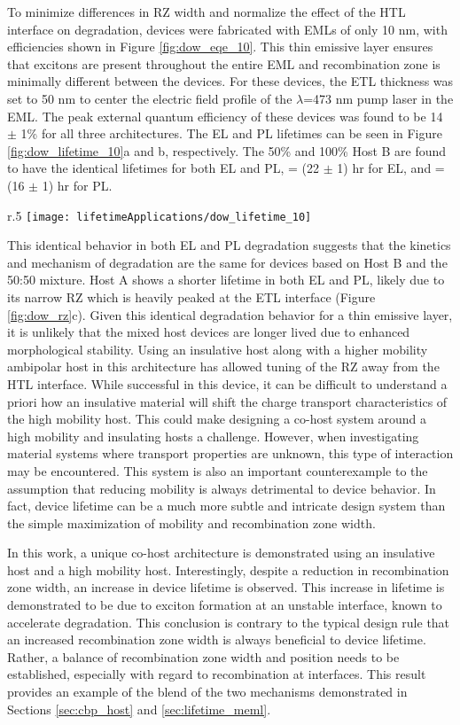 \documentclass[../thesis.tex]{subfiles}
\begin{document}
To minimize differences in RZ width and normalize the effect of the HTL interface on degradation, devices were fabricated with EMLs of only 10 nm, with efficiencies shown in Figure \ref{fig:dow_eqe_10}. 
This thin emissive layer ensures that excitons are present throughout the entire EML and recombination zone is minimally different between the devices. 
For these devices, the ETL thickness was set to 50 nm to center the electric field profile of the $\lambda$=473 nm pump laser in the EML. 
The peak external quantum efficiency of these devices was found to be 14 $\pm$ 1\% for all three architectures. 
The EL and PL lifetimes can be seen in Figure \ref{fig:dow_lifetime_10}a and b, respectively. The 50\% and 100\% Host B are found to have the identical lifetimes for both EL and PL,  = (22 $\pm$ 1) hr for EL, and  = (16 $\pm$ 1) hr for PL. 
\begin{wrapfigure}{r}{.5\textwidth}
\centering
\texttt{[image: lifetimeApplications/dow\_lifetime\_10]}
\caption{Lifetimes for the 10 nm EML devices.}
\label{fig:dow_lifetime_10}
\end{wrapfigure}
This identical behavior in both EL and PL degradation suggests that the kinetics and mechanism of degradation are the same for devices based on Host B and the 50:50 mixture. 
Host A shows a shorter lifetime in both EL and PL, likely due to its narrow RZ which is heavily peaked at the ETL interface (Figure \ref{fig:dow_rz}c). 
Given this identical degradation behavior for a thin emissive layer, it is unlikely that the mixed host devices are longer lived due to enhanced morphological stability. 
Using an insulative host along with a higher mobility ambipolar host in this architecture has allowed tuning of the RZ away from the HTL interface. 
While successful in this device, it can be difficult to understand a priori how an insulative material will shift the charge transport characteristics of the high mobility host. 
This could make designing a co-host system around a high mobility and insulating hosts a challenge. 
However, when investigating material systems where transport properties are unknown, this type of interaction may be encountered. 
This system is also an important counterexample to the assumption that reducing mobility is always detrimental to device behavior. 
In fact, device lifetime can be a much more subtle and intricate design system than the simple maximization of mobility and recombination zone width. 

In this work, a unique co-host architecture is demonstrated using an insulative host and a high mobility host. 
Interestingly, despite a reduction in recombination zone width, an increase in device lifetime is observed. 
This increase in lifetime is demonstrated to be due to exciton formation at an unstable interface, known to accelerate degradation. 
This conclusion is contrary to the typical design rule that an increased recombination zone width is always beneficial to device lifetime. 
Rather, a balance of recombination zone width and position needs to be established, especially with regard to recombination at interfaces.
This result provides an example of the blend of the two mechanisms demonstrated in Sections \ref{sec:cbp_host} and \ref{sec:lifetime_meml}.


\end{document}
